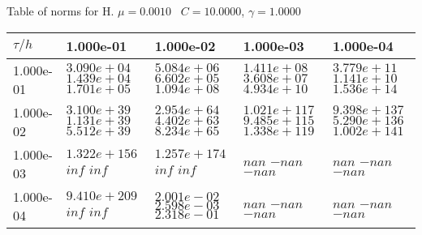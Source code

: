 \begin{center}
Table of norms for H. $\mu = 0.0010$ \, $C = 10.0000$, $\gamma = 1.0000$
  
\begin{tabular}{|p{1in}|p{1in}|p{1in}|p{1in}|p{1in}|} \hline
$\tau / h$ &1.000e-01 &1.000e-02 &1.000e-03 &1.000e-04 \\ \hline 
1.000e-01 & $3.090e+04$  $1.439e+04$  $1.701e+05$  & $5.084e+06$  $6.602e+05$  $1.094e+08$  & $1.411e+08$  $3.608e+07$  $4.934e+10$  & $3.779e+11$  $1.141e+10$  $1.536e+14$  \\ \hline 
1.000e-02 & $3.100e+39$  $1.131e+39$  $5.512e+39$  & $2.954e+64$  $4.402e+63$  $8.234e+65$  & $1.021e+117$  $9.485e+115$  $1.338e+119$  & $9.398e+137$  $5.290e+136$  $1.002e+141$  \\ \hline 
1.000e-03 & $1.322e+156$  $inf$  $inf$  & $1.257e+174$  $inf$  $inf$  & $nan$  $-nan$  $-nan$  & $nan$  $-nan$  $-nan$  \\ \hline 
1.000e-04 & $9.410e+209$  $inf$  $inf$  & $2.001e-02$  $2.598e-03$  $2.318e-01$  & $nan$  $-nan$  $-nan$  & $nan$  $-nan$  $-nan$  \\ \hline 

\end{tabular}\\[20pt]
\end{center}
